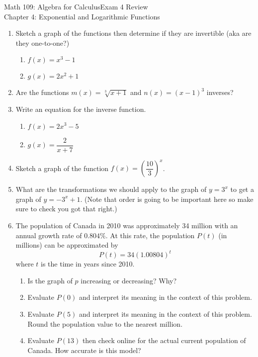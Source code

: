 \documentclass[12pt]{article}
\begin{document}
	\noindent Math 109: Algebra for Calculus\hfill Exam 4 Review\\
	\mbox{}\hfill Chapter 4: Exponential and Logarithmic Functions
	\setcounter{page}{1}
	\fancyfoot[C]{\thepage}
\begin{enumerate}
	
	\item Sketch a graph of the functions then determine if they are invertible (aka are they one-to-one?)
		\begin{enumerate}
			\item $f(x)=x^3-1$\vfill
			\item $g(x)=2x^2+1$\vfill
		\end{enumerate}
	\item Are the functions $m(x)=\sqrt[3]{x+1}$ and $n(x)=(x-1)^3$ inverses?\vfill
	\item Write an equation for the inverse function.
		\begin{enumerate}
			\item $f(x)=2x^3-5$\vfill
			\item $g(x)=\dfrac{2}{x+7}$\vfill
		\end{enumerate}
	
	
	
	\newpage
	\item Sketch a graph of the function $f(x)=\left(\dfrac{10}{3}\right)^x$.\vfill
	\item What are the transformations we should apply to the graph of $y=3^x$ to get a graph of $y=-3^x+1$.  (Note that order is going to be important here so make sure to check you got that right.)
	\vfill
	\newpage
	\item The population of Canada in 2010 was approximately 34 million with an annual growth rate of $0.804\%$.  At this rate, the population $P(t)$ (in millions) can be approximated by 
	$$P(t)=34(1.00804)^t$$ where $t$ is the time in years since 2010.
		\begin{enumerate}
			\item Is the graph of $p$ increasing or decreasing? Why?\vskip 1in
			\item Evaluate $P(0)$ and interpret its meaning in the context of this problem.\vfill
			\item Evaluate $P(5)$ and interpret its meaning in the context of this problem. Round the population value to the nearest million.\vfill
			\item Evaluate $P(13)$ then check online for the actual current population of Canada.  How accurate is this model?\vfill
		\end{enumerate}
	

\end{enumerate}
\end{document}
